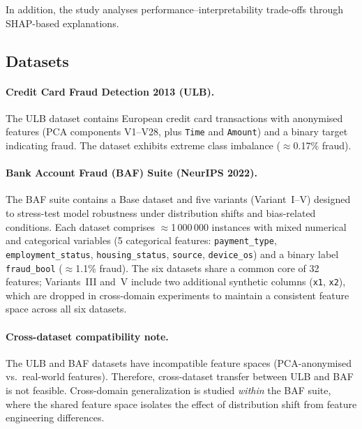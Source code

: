 In addition, the study analyses performance--interpretability trade-offs through SHAP-based explanations.

\subsection{Datasets}
\label{sec:datasets}

\paragraph{Credit Card Fraud Detection 2013 (ULB).}
The ULB dataset contains European credit card transactions with anonymised features (PCA components V1--V28, plus \texttt{Time} and \texttt{Amount}) and a binary target indicating fraud. The dataset exhibits extreme class imbalance ($\approx$0.17\% fraud).

\paragraph{Bank Account Fraud (BAF) Suite (NeurIPS 2022).}
The BAF suite contains a Base dataset and five variants (Variant~I--V) designed to stress-test model robustness under distribution shifts and bias-related conditions. Each dataset comprises $\approx$1\,000\,000 instances with mixed numerical and categorical variables (5 categorical features: \texttt{payment\_type}, \texttt{employment\_status}, \texttt{housing\_status}, \texttt{source}, \texttt{device\_os}) and a binary label \texttt{fraud\_bool} ($\approx$1.1\% fraud). The six datasets share a common core of 32 features; Variants~III and~V include two additional synthetic columns (\texttt{x1}, \texttt{x2}), which are dropped in cross-domain experiments to maintain a consistent feature space across all six datasets.

\paragraph{Cross-dataset compatibility note.}
The ULB and BAF datasets have incompatible feature spaces (PCA-anonymised vs.\ real-world features). Therefore, cross-dataset transfer between ULB and BAF is not feasible. Cross-domain generalization is studied \emph{within} the BAF suite, where the shared feature space isolates the effect of distribution shift from feature engineering differences.

